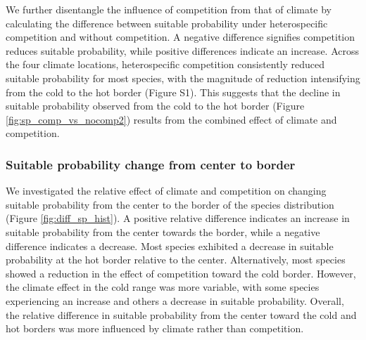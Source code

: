 We further disentangle the influence of competition from that of climate
by calculating the difference between suitable probability under
heterospecific competition and without competition. A negative
difference signifies competition reduces suitable probability, while
positive differences indicate an increase. Across the four climate
locations, heterospecific competition consistently reduced suitable
probability for most species, with the magnitude of reduction
intensifying from the cold to the hot border (Figure S1). This suggests
that the decline in suitable probability observed from the cold to the
hot border (Figure \ref{fig:sp_comp_vs_nocomp2}) results from the
combined effect of climate and competition.

\hypertarget{suitable-probability-change-from-center-to-border}{%
\subsubsection{Suitable probability change from center to
border}\label{suitable-probability-change-from-center-to-border}}

We investigated the relative effect of climate and competition on
changing suitable probability from the center to the border of the
species distribution (Figure \ref{fig:diff_sp_hist}). A positive
relative difference indicates an increase in suitable probability from
the center towards the border, while a negative difference indicates a
decrease. Most species exhibited a decrease in suitable probability at
the hot border relative to the center. Alternatively, most species
showed a reduction in the effect of competition toward the cold border.
However, the climate effect in the cold range was more variable, with
some species experiencing an increase and others a decrease in suitable
probability. Overall, the relative difference in suitable probability
from the center toward the cold and hot borders was more influenced by
climate rather than competition.

